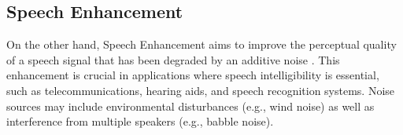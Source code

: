 \documentclass[logo,bsc,singlespacing,parskip,online]{infthesis}
\begin{document}

\newpage
\subsection{Speech Enhancement}
On the other hand, Speech Enhancement aims to improve the perceptual quality of a speech signal that 
has been degraded by an additive noise \cite{loizou_speech_2007}. 
This enhancement is crucial in applications where speech intelligibility is essential, such as telecommunications, hearing aids, and speech recognition systems. Noise sources may include environmental disturbances (e.g., wind noise) as well as interference from multiple speakers (e.g., babble noise).
\end{document}
